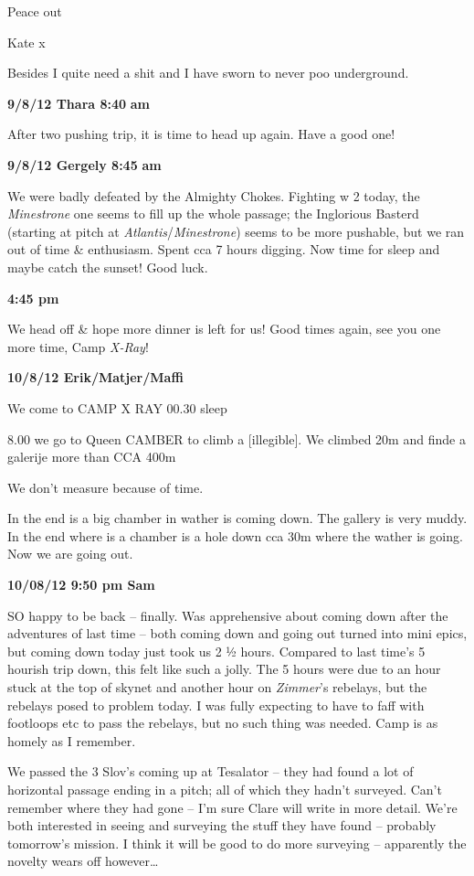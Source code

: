Peace out

Kate x

Besides I quite need a shit and I have sworn to never poo underground.

\textbf{9/8/12 Thara 8:40} \textbf{am}

After two pushing trip, it is time to head up again. Have a good one!

\textbf{9/8/12 Gergely 8:45} \textbf{am}

We were badly defeated by the Almighty Chokes. Fighting w 2 today, the
\emph{Minestrone} one seems to fill up the whole passage; the Inglorious
Basterd (starting at pitch at \emph{Atlantis}/\emph{Minestrone}) seems
to be more pushable, but we ran out of time \& enthusiasm. Spent cca 7
hours digging. Now time for sleep and maybe catch the sunset! Good luck.

\textbf{4:45 pm}

We head off \& hope more dinner is left for us! Good times again, see
you one more time, Camp \emph{X-Ray}!

\textbf{10/8/12 Erik/Matjer/Maffi}

We come to CAMP X RAY 00.30 sleep

8.00 we go to Queen CAMBER to climb a {[}illegible{]}. We climbed 20m
and finde a galerije more than CCA 400m

We don't measure because of time.

In the end is a big chamber in wather is coming down. The gallery is
very muddy. In the end where is a chamber is a hole down cca 30m where
the wather is going. Now we are going out.

\textbf{10/08/12 9:50 pm Sam}

SO happy to be back -- finally. Was apprehensive about coming down after
the adventures of last time -- both coming down and going out turned
into mini epics, but coming down today just took us 2 ½ hours. Compared
to last time's 5 hourish trip down, this felt like such a jolly. The 5
hours were due to an hour stuck at the top of skynet and another hour on
\emph{Zimmer}'s rebelays, but the rebelays posed to problem today. I was
fully expecting to have to faff with footloops etc to pass the rebelays,
but no such thing was needed. Camp is as homely as I remember.

We passed the 3 Slov's coming up at Tesalator -- they had found a lot of
horizontal passage ending in a pitch; all of which they hadn't surveyed.
Can't remember where they had gone -- I'm sure Clare will write in more
detail. We're both interested in seeing and surveying the stuff they
have found -- probably tomorrow's mission. I think it will be good to do
more surveying -- apparently the novelty wears off however\ldots{}

